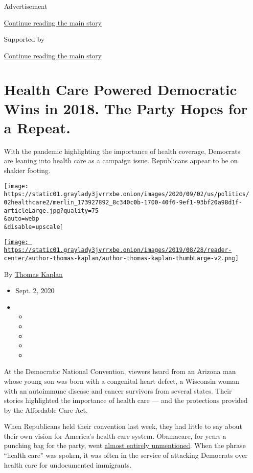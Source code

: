 Advertisement

\protect\hyperlink{after-top}{Continue reading the main story}

Supported by

\protect\hyperlink{after-sponsor}{Continue reading the main story}

\hypertarget{health-care-powered-democratic-wins-in-2018-the-party-hopes-for-a-repeat}{%
\section{Health Care Powered Democratic Wins in 2018. The Party Hopes
for a
Repeat.}\label{health-care-powered-democratic-wins-in-2018-the-party-hopes-for-a-repeat}}

With the pandemic highlighting the importance of health coverage,
Democrats are leaning into health care as a campaign issue. Republicans
appear to be on shakier footing.

\texttt{[image: https://static01.graylady3jvrrxbe.onion/images/2020/09/02/us/politics/02healthcare2/merlin\_173927892\_8c340c0b-1700-40f6-9ef1-93bf20a98d1f-articleLarge.jpg?quality=75\\\&auto=webp\\\&disable=upscale]}

\href{https://www.nytimes3xbfgragh.onion/by/thomas-kaplan}{\texttt{[image: https://static01.graylady3jvrrxbe.onion/images/2019/08/28/reader-center/author-thomas-kaplan/author-thomas-kaplan-thumbLarge-v2.png]}}

By \href{https://www.nytimes3xbfgragh.onion/by/thomas-kaplan}{Thomas
Kaplan}

\begin{itemize}
\item
  Sept. 2, 2020
\item
  \begin{itemize}
  \item
  \item
  \item
  \item
  \item
  \end{itemize}
\end{itemize}

At the Democratic National Convention, viewers heard from an Arizona man
whose young son was born with a congenital heart defect, a Wisconsin
woman with an autoimmune disease and cancer survivors from several
states. Their stories highlighted the importance of health care --- and
the protections provided by the Affordable Care Act.

When Republicans held their convention last week, they had little to say
about their own vision for America's health care system. Obamacare, for
years a punching bag for the party, went
\href{https://www.nytimes3xbfgragh.onion/2020/08/28/upshot/republican-convention-obamacare.html}{almost
entirely unmentioned}. When the phrase ``health care'' was spoken, it
was often in the service of attacking Democrats over health care for
undocumented immigrants.

